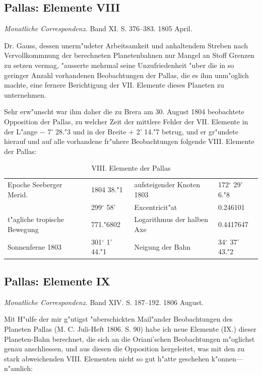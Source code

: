 \documentclass[12pt,a4paper]{article}
\begin{document}
\subsection{Pallas: Elemente VIII}

\textit{Monatliche Correspondenz.} Band XI. S. 376--383. 1805 April.

Dr. Gauss, dessen unerm"udeter Arbeitsamkeit und anhaltendem Streben nach Vervollkommnung der berechneten Planetenbahnen nur Mangel an Stoff Grenzen zu setzen vermag, "ausserte mehrmal seine Unzufriedenheit "uber die in so geringer Anzahl vorhandenen Beobachtungen der Pallas, die es ihm unm"oglich machte, eine fernere Berichtigung der VII. Elemente dieses Planeten zu unternehmen.

Sehr erw"unscht war ihm daher die zu Brera am 30. August 1804 beobachtete Opposition der Pallas, zu welcher Zeit der mittlere Fehler der VII. Elemente in der L"ange $-$ 7' 28."3 und in der Breite $+$ 2' 14."7 betrug, und er gr"undete hierauf und auf alle vorhandene fr"uhere Beobachtungen folgende VIII. Elemente der Pallas:

\begin{table}[H]
\centering
\begin{tabular}{l l | l l}
\toprule
Epoche Seeberger Merid. & 1804 38."1 & aufsteigender Knoten 1803 & 172$^\circ$ 29' 6."8 \\
& 299$^\circ$ 58' & Excentricit"at & 0.246101 \\
t"agliche tropische Bewegung & 771."6802 & Logarithmus der halben Axe & 0.4417647 \\
Sonnenferne 1803 & 301$^\circ$ 1' 44."1 & Neigung der Bahn & 34$^\circ$ 37' 43."2 \\
\bottomrule
\end{tabular}
\caption{VIII. Elemente der Pallas}
\end{table}

\subsection{Pallas: Elemente IX}

\textit{Monatliche Correspondenz.} Band XIV. S. 187--192. 1806 August.

Mit H"ulfe der mir g"utigst "uberschickten Mail"ander Beobachtungen des Planeten Pallas (M. C. Juli-Heft 1806. S. 90) habe ich neue Elemente (IX.) dieser Planeten-Bahn berechnet, die sich an die Oriani'schen Beobachtungen m"oglichst genau anschliessen, und aus diesen die Opposition hergeleitet, was mit den zu stark abweichenden VIII. Elementen nicht so gut h"atte geschehen k"onnen---n"amlich:
\end{document}
